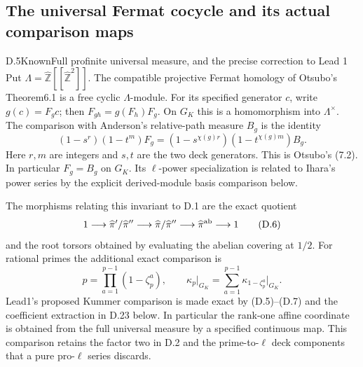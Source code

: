 \subsection{The universal Fermat cocycle and its actual comparison maps}

\begin{statement}{D.5}{Known}{Full profinite universal measure, and the precise correction to Lead 1}
Put $\Lambda=\widehat{\mathbb Z}[[\widehat{\mathbb Z}^2]]$. The compatible projective Fermat homology of Otsubo's Theorem6.1 is a free cyclic $\Lambda$-module. For its specified generator $c$, write $g(c)=F_g c$; then
$F_{gh}=g(F_h)F_g$. On $G_K$ this is a homomorphism into $\Lambda^\times$. The comparison with Anderson's relative-path measure $B_g$ is the identity
\[
 (1-s^r)(1-t^m)F_g=(1-s^{\chi(g)r})(1-t^{\chi(g)m})B_g.       \tag{D.5}
\]
Here $r,m$ are integers and $s,t$ are the two deck generators. This is Otsubo's (7.2). In particular $F_g=B_g$ on $G_K$. Its $\ell$-power specialization is related to Ihara's power series by the explicit derived-module basis comparison below.

The morphisms relating this invariant to D.1 are the exact quotient
\[
 1\longrightarrow\widehat\pi'/\widehat\pi''
 \longrightarrow\widehat\pi/\widehat\pi''
 \longrightarrow\widehat\pi^{\rm ab}\longrightarrow1
                                                               \tag{D.6}
\]
and the root torsors obtained by evaluating the abelian covering at $1/2$. For rational primes the additional exact comparison is
\[
 p=\prod_{a=1}^{p-1}(1-\zeta_p^a),\qquad
 \kappa_p\big|_{G_K}=\sum_{a=1}^{p-1}\kappa_{1-\zeta_p^a}\big|_{G_K}.       \tag{D.7}
\]
Lead1's proposed Kummer comparison is made exact by (D.5)--(D.7) and the coefficient extraction in D.23 below. In particular the rank-one affine coordinate is obtained from the full universal measure by a specified continuous map. This comparison retains the factor two in D.2 and the prime-to-$\ell$ deck components that a pure pro-$\ell$ series discards.
\end{statement}
